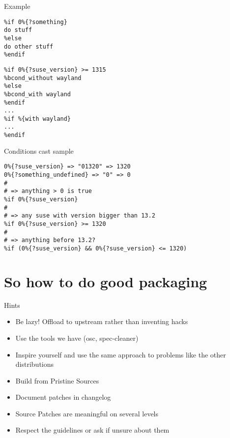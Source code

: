 \documentclass{beamer}
\begin{document}
\begin{frame}[fragile]{Example}
	\begin{small}
	\begin{verbatim}
%if 0%{?something}
do stuff
%else
do other stuff
%endif
	\end{verbatim}
	\end{small}
	\begin{small}
	\begin{verbatim}
%if 0%{?suse_version} >= 1315
%bcond_without wayland
%else
%bcond_with wayland
%endif
...
%if %{with wayland}
...
%endif
	\end{verbatim}
	\end{small}
\end{frame}

\begin{frame}[fragile]{Conditions cast sample}
       \begin{small}
       \begin{verbatim}
0%{?suse_version} => "01320" => 1320
0%{?something_undefined} => "0" => 0
#
# => anything > 0 is true
%if 0%{?suse_version}
#
# => any suse with version bigger than 13.2
%if 0%{?suse_version} >= 1320
#
# => anything before 13.2?
%if (0%{?suse_version} && 0%{?suse_version} <= 1320)
       \end{verbatim}
       \end{small}
\end{frame}

\section{So how to do good packaging}

\begin{frame}[t]{Hints}
	\begin{itemize}
	\item Be lazy! Offload to upstream rather than inventing hacks
    \item Use the tools we have (osc, spec-cleaner)
    \item Inspire yourself and use the same approach to problems like the other distributions
    \item Build from Pristine Sources
    \item Document patches in changelog
    \item Source Patches are meaningful on several levels
    \item Respect the guidelines or ask if unsure about them
	\end{itemize}
\end{frame}
\end{document}
